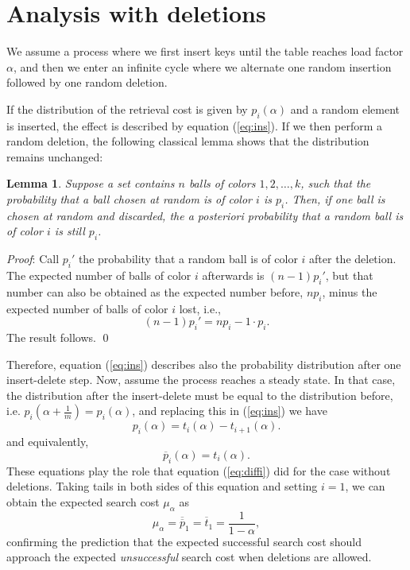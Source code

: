\documentclass[proceedings]{aofa}
\newtheorem{lemma}{Lemma}
\newcommand{\tail}[1]{\overline{#1}}
\newcommand{\ttail}[1]{\tail{\tail{#1}}}
\begin{document}
\section{Analysis with deletions}
\label{conborrados}

We assume a process where we first insert keys until the table reaches
load factor $\alpha$, and then we enter an infinite cycle where we alternate
one random insertion followed by one random deletion.

If the distribution of the retrieval cost is given by $p_i(\alpha)$
and a random element is inserted, the effect is described by equation
(\ref{eq:ins}).
If we then perform a random deletion, the following classical lemma\cite{feller1} shows that the distribution remains unchanged:

\begin{lemma}\label{lemma:balls}
Suppose a set contains $n$ balls of colors $1,2,\ldots,k$, such that the
probability that a ball chosen at random is of color $i$ is $p_i$.
Then, if one ball is chosen at random and discarded, the {\em a posteriori}
probability that a random ball is of color $i$ is still $p_i$.
\end{lemma}
{\em Proof\/}:
Call $p_i'$ the probability that a random ball is of color $i$
after the deletion.
The expected number of balls of color $i$ afterwards is $(n-1)p_i'$,
but that number can also be obtained as the expected number before,
$np_i$, minus the expected number of balls of color $i$ lost,
i.e.,
\begin{equation}
(n-1)p_i' = np_i - 1\cdot p_i.
\end{equation}
The result follows. \qed

Therefore, equation (\ref{eq:ins}) describes also the probability distribution
after one insert-delete step.
Now, assume the process reaches a steady state.
In that case, the distribution after the insert-delete must be equal
to the distribution before, i.e. $p_i(\alpha+\frac{1}{m}) = p_i(\alpha)$,
and replacing this in (\ref{eq:ins}) we have
\begin{equation}\label{eq:nodiffi}
p_i(\alpha) = t_i(\alpha)-t_{i+1}(\alpha).
\end{equation}
and equivalently,
\begin{equation}\label{eq:nodiffi2}
\tail{p}_i(\alpha) = t_i(\alpha).
\end{equation}
These equations play the role that equation (\ref{eq:diffi}) did for the case without deletions.
Taking tails in both sides of this equation and setting $i=1$,  we can obtain the expected search cost $\mu_{\alpha}$ as
\begin{equation}
\mu_{\alpha} = \ttail{p}_1 = \tail{t}_1 =
\frac{1}{1-\alpha},
\end{equation}
confirming the prediction that the expected successful search cost
should approach the expected {\em unsuccessful} search cost when
deletions are allowed.
\end{document}
